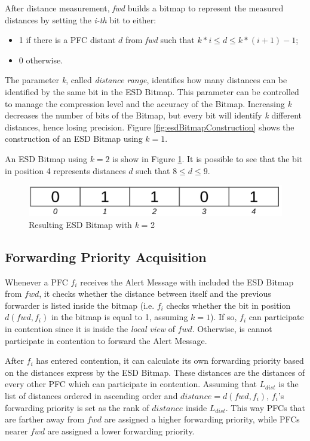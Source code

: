 			After distance measurement, \textit{fwd} builds a bitmap to represent the measured distances by setting the \textit{i-th} bit to either:
			\begin{itemize}
				\item 1 if there is a PFC distant $d$ from \textit{fwd} such that $k * i \leq d \leq k * ( i + 1 ) - 1$;
				\item 0 otherwise.
			\end{itemize} 
			The parameter \textit{k}, called \textit{distance range}, identifies how many distances can be identified by the same bit in the ESD Bitmap. This parameter can be controlled to manage the compression level and the accuracy of the Bitmap. Increasing \textit{k} decreases the number of bits of the Bitmap, but every bit will identify \textit{k} different distances, hence losing precision.
			Figure \ref{fig:esdBitmapConstruction} shows the construction of an ESD Bitmap using $k = 1$.
			
			
			An ESD Bitmap using $k = 2$ is show in Figure \ref{fig:esdBitmapConstructionK2}. It is possible to see that the bit in position 4 represents distances $d$ such that $8 \leq d \leq 9$. 
			
			\begin{figure}[H]
				\centering
				\includegraphics[width=\textwidth]{immagini/esdBitmapConstructionK2}
				\caption{Resulting ESD Bitmap with \textit{k} = 2}
				\label{fig:esdBitmapConstructionK2}
			\end{figure}
		
		\subsection{Forwarding Priority Acquisition}
			Whenever a PFC $f_i$ receives the Alert Message with included the ESD Bitmap from $fwd$, it checks whether the distance between itself and the previous forwarder is listed inside the bitmap (i.e. $f_i$ checks whether the bit in position $d(fwd, f_i)$ in the bitmap is equal to 1, assuming $k = 1$). If so, $f_i$ can participate in contention since it is inside the \textit{local view} of $fwd$. Otherwise, is cannot participate in contention to forward the Alert Message.
			
			
			After $f_i$ has entered contention, it can calculate its own forwarding priority based on the distances express by the ESD Bitmap. These distances are the distances of every other PFC which can participate in contention. Assuming that $L_{dist}$ is the list of distances ordered in ascending order and $distance = d(fwd, f_i)$, $f_i$'s forwarding priority is set as the rank of $distance$ inside $L_{dist}$. This way PFCs that are farther away from $fwd$ are assigned a higher forwarding priority, while PFCs nearer $fwd$ are assigned a lower forwarding priority.
			
